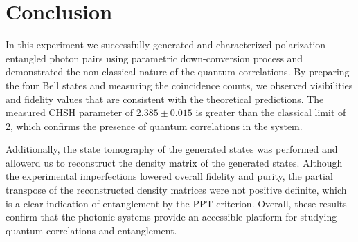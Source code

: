 \section{Conclusion}
In this experiment we successfully generated and characterized polarization entangled photon
pairs using parametric down-conversion process and demonstrated the non-classical nature of the
quantum correlations. By preparing the four Bell states and measuring the coincidence counts, we
observed visibilities and fidelity values that are consistent with the theoretical predictions.
The measured CHSH parameter of $2.385 \pm 0.015$ is greater than the classical limit of 2, which
confirms the presence of quantum correlations in the system. 

Additionally, the state tomography of the generated states was performed and allowerd us to
reconstruct the density matrix of the generated states. Although the experimental imperfections
lowered overall fidelity and purity, the partial transpose of the reconstructed density matrices
were not positive definite, which is a clear indication of entanglement by the PPT criterion.
Overall, these results confirm that the photonic systems provide an accessible platform for
studying quantum correlations and entanglement.